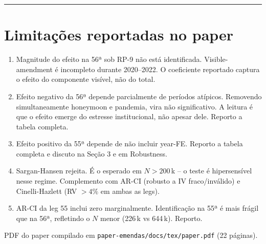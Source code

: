 \documentclass[11pt,a4paper]{article}
\begin{document}
\bigskip\hrule\bigskip

\section{Limitações reportadas no paper}

\begin{enumerate}[leftmargin=*,itemsep=2pt]
\item Magnitude do efeito na 56ª sob RP-9 não está identificada. Visible-amendment é incompleto durante 2020--2022. O coeficiente reportado captura o efeito do componente visível, não do total.

\item Efeito negativo da 56ª depende parcialmente de períodos atípicos. Removendo simultaneamente honeymoon e pandemia, vira não significativo. A leitura é que o efeito emerge do estresse institucional, não apesar dele. Reporto a tabela completa.

\item Efeito positivo da 55ª depende de não incluir year-FE. Reporto a tabela completa e discuto na Seção 3 e em Robustness.

\item Sargan-Hansen rejeita. É o esperado em $N > 200$\,k -- o teste é hipersensível nesse regime. Complemento com AR-CI (robusto a IV fraco/inválido) e Cinelli-Hazlett (RV $> 4\%$ em ambas as legs).

\item AR-CI da leg 55 inclui zero marginalmente. Identificação na 55ª é mais frágil que na 56ª, refletindo o $N$ menor (226\,k vs 644\,k). Reporto.
\end{enumerate}

\bigskip

\noindent
PDF do paper compilado em \texttt{paper-emendas/docs/tex/paper.pdf} (22 páginas).
\end{document}
